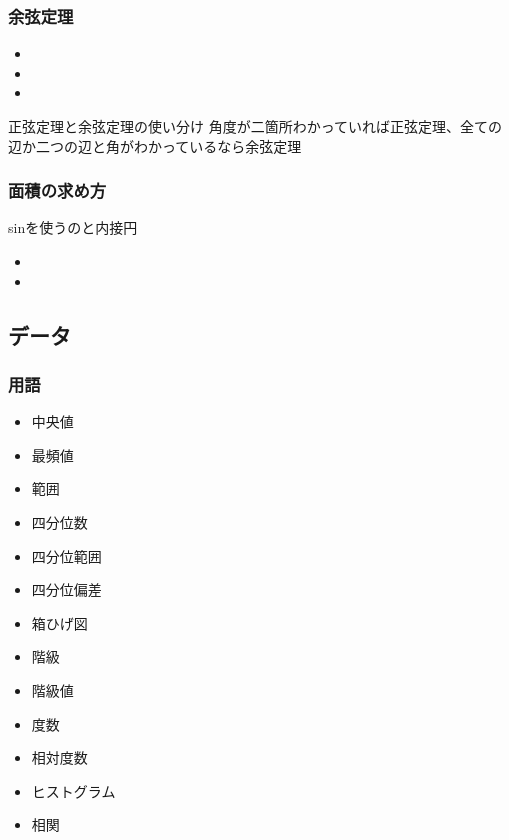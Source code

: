 \documentclass[10pt,dvipdfmx]{jsarticle}
\newcommand{\answer}[2]{{\color{orange}#2}}
\newcommand{\answer}[2]{\vspace{#1mm}}
\begin{document}
\subsubsection*{余弦定理}
\begin{Large}
  \begin{itemize}
    \item  \item  \item
  \end{itemize}
\end{Large}

\begin{itembox}[l]{正弦定理と余弦定理の使い分け}
  \answer{8}{角度が二箇所わかっていれば正弦定理、全ての辺か二つの辺と角がわかっているなら余弦定理}
\end{itembox}


\subsubsection*{面積の求め方}
\answer{0}{sinを使うのと内接円}
\begin{multicols}{2}
  \begin{Large}
    \begin{itemize}
      \item  \item
    \end{itemize}
  \end{Large}
\end{multicols}

\newpage

\subsection*{データ}
\subsubsection*{用語}
\begin{Large}
  \begin{itemize}
    \item 中央値
    \item 最頻値
    \item 範囲
    \item 四分位数
    \item 四分位範囲
    \item 四分位偏差
    \item 箱ひげ図
    \item 階級
    \item 階級値
    \item 度数
    \item 相対度数
    \item ヒストグラム
    \item 相関
  \end{itemize}
\end{Large}
\end{document}
